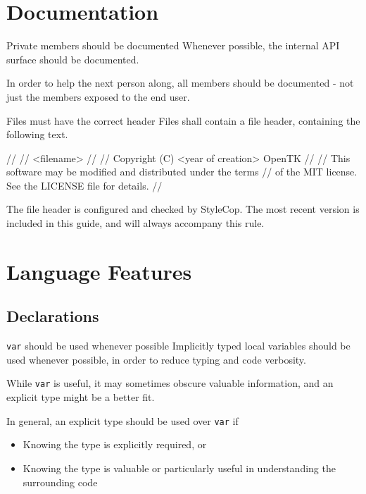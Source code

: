 \documentclass[11pt,a4paper]{article}
\newcounter{rule}[section]
\begin{document}
\section{Documentation}
\begin{should}{Private members should be documented}
Whenever possible, the internal API surface should be documented.
\end{should}

In order to help the next person along, all members should be documented - not just the members exposed to the end user.

\begin{must}{Files must have the correct header}
Files shall contain a file header, containing the following text.
\end{must}

\begin{code}
// 
//  <filename>
//
//  Copyright (C) <year of creation> OpenTK
//
//  This software may be modified and distributed under the terms
//  of the MIT license. See the LICENSE file for details.
//
\end{code}

The file header is configured and checked by StyleCop. The most recent version is included in this guide, and will always accompany this rule.

\section{Language Features}
\subsection{Declarations}
\begin{should}{\texttt{var} should be used whenever possible}
Implicitly typed local variables should be used whenever possible, in order to reduce typing and code verbosity.
\end{should}

While \texttt{var} is useful, it may sometimes obscure valuable information, and an explicit type might be a better fit.

In general, an explicit type should be used over \texttt{var} if
\begin{itemize}
\item Knowing the type is explicitly required, or
\item Knowing the type is valuable or particularly useful in understanding the surrounding code
\end{itemize}
\end{document}
